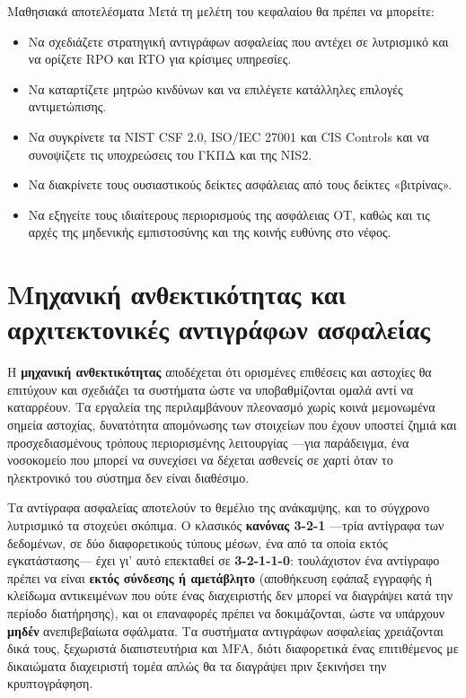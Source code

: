 \documentclass[11pt,openany]{book}
\begin{document}
\begin{outcomesbox}{Μαθησιακά αποτελέσματα}
Μετά τη μελέτη του κεφαλαίου θα πρέπει να μπορείτε:
\begin{itemize}
  \item Να σχεδιάζετε στρατηγική αντιγράφων ασφαλείας που αντέχει σε λυτρισμικό και να ορίζετε RPO και RTO για κρίσιμες υπηρεσίες.
  \item Να καταρτίζετε μητρώο κινδύνων και να επιλέγετε κατάλληλες επιλογές αντιμετώπισης.
  \item Να συγκρίνετε τα NIST CSF 2.0, ISO/IEC 27001 και CIS Controls και να συνοψίζετε τις υποχρεώσεις του ΓΚΠΔ και της NIS2.
  \item Να διακρίνετε τους ουσιαστικούς δείκτες ασφάλειας από τους δείκτες «βιτρίνας».
  \item Να εξηγείτε τους ιδιαίτερους περιορισμούς της ασφάλειας OT, καθώς και τις αρχές της μηδενικής εμπιστοσύνης και της κοινής ευθύνης στο νέφος.
\end{itemize}
\end{outcomesbox}

\section{Μηχανική ανθεκτικότητας και αρχιτεκτονικές αντιγράφων ασφαλείας}\label{sec:13.1}
Η \textbf{μηχανική ανθεκτικότητας} αποδέχεται ότι ορισμένες επιθέσεις και αστοχίες θα επιτύχουν και σχεδιάζει τα συστήματα ώστε να υποβαθμίζονται ομαλά αντί να καταρρέουν. Τα εργαλεία της περιλαμβάνουν πλεονασμό χωρίς κοινά μεμονωμένα σημεία αστοχίας, δυνατότητα απομόνωσης των στοιχείων που έχουν υποστεί ζημιά και προσχεδιασμένους τρόπους περιορισμένης λειτουργίας —για παράδειγμα, ένα νοσοκομείο που μπορεί να συνεχίσει να δέχεται ασθενείς σε χαρτί όταν το ηλεκτρονικό του σύστημα δεν είναι διαθέσιμο.

Τα αντίγραφα ασφαλείας αποτελούν το θεμέλιο της ανάκαμψης, και το σύγχρονο λυτρισμικό τα στοχεύει σκόπιμα. Ο κλασικός \textbf{κανόνας 3-2-1} —τρία αντίγραφα των δεδομένων, σε δύο διαφορετικούς τύπους μέσων, ένα από τα οποία εκτός εγκατάστασης— έχει γι' αυτό επεκταθεί σε \textbf{3-2-1-1-0}: τουλάχιστον ένα αντίγραφο πρέπει να είναι \textbf{εκτός σύνδεσης ή αμετάβλητο} (αποθήκευση εφάπαξ εγγραφής ή κλείδωμα αντικειμένων που ούτε ένας διαχειριστής δεν μπορεί να διαγράψει κατά την περίοδο διατήρησης), και οι επαναφορές πρέπει να δοκιμάζονται, ώστε να υπάρχουν \textbf{μηδέν} ανεπιβεβαίωτα σφάλματα. Τα συστήματα αντιγράφων ασφαλείας χρειάζονται δικά τους, ξεχωριστά διαπιστευτήρια και MFA, διότι διαφορετικά ένας επιτιθέμενος με δικαιώματα διαχειριστή τομέα απλώς θα τα διαγράψει πριν ξεκινήσει την κρυπτογράφηση.
\end{document}
